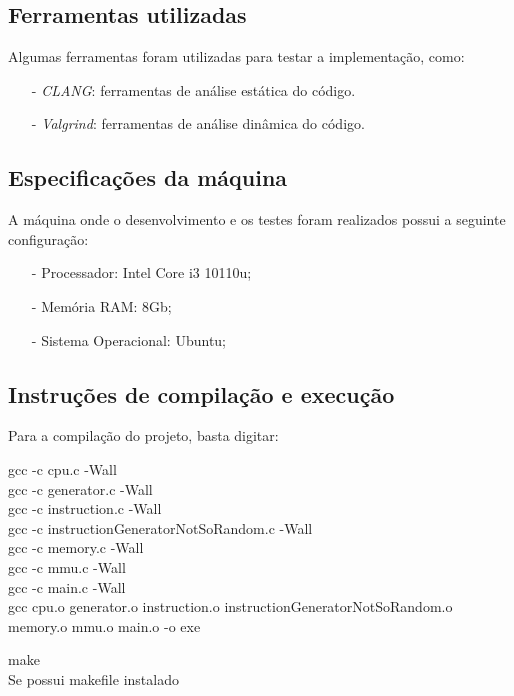 \documentclass{article}
\begin{document}
\subsection{Ferramentas utilizadas}
Algumas ferramentas foram utilizadas para testar a implementação, como:
\begin{itemize}
    \item[-] \textit{CLANG}: ferramentas de análise estática do código.
    \item[-] \textit{Valgrind}: ferramentas de análise dinâmica do código.
\end{itemize}

\subsection{Especificações da máquina}
A máquina onde o desenvolvimento e os testes foram realizados possui a seguinte configuração:
\begin{itemize}
    \item[-] Processador: Intel Core i3 10110u;
    \item[-] Memória RAM: 8Gb;
    \item[-] Sistema Operacional: Ubuntu;
\end{itemize}

\subsection{Instruções de compilação e execução}

Para a compilação do projeto, basta digitar:

\begin{tcolorbox}[title=Compilando o projeto,width=\linewidth]
    gcc -c cpu.c -Wall
    \\ gcc -c generator.c -Wall
    \\ gcc -c instruction.c -Wall
    \\ gcc -c instructionGeneratorNotSoRandom.c -Wall
    \\ gcc -c memory.c -Wall
    \\ gcc -c mmu.c -Wall
    \\ gcc -c main.c -Wall
    \\ gcc cpu.o generator.o instruction.o  instructionGeneratorNotSoRandom.o memory.o mmu.o main.o -o exe
\end{tcolorbox}

\begin{tcolorbox}[title=Método mais prático,width=\linewidth]
    make
    \\Se possui makefile instalado
\end{tcolorbox}
\end{document}
